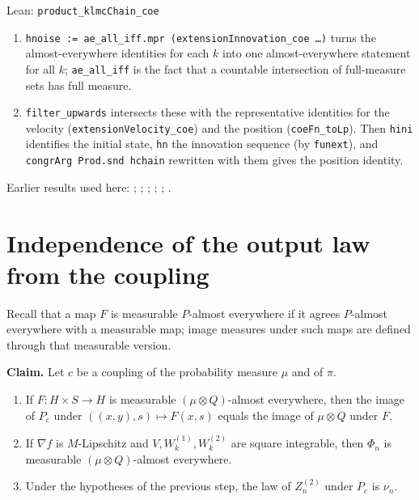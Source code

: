 \documentclass[11pt,a4paper]{article}
\begin{document}
\begin{leanbox}{Lean: \texttt{product\_\allowbreak{}klmcChain\_\allowbreak{}coe}}
\begin{enumerate}
\item \texttt{hnoise := ae\_\allowbreak{}all\_\allowbreak{}iff.\allowbreak{}mpr (extension\allowbreak{}Innovation\_\allowbreak{}coe …)} turns the almost-everywhere identities for each \(k\) into one almost-everywhere statement for all \(k\); \texttt{ae\_\allowbreak{}all\_\allowbreak{}iff} is the fact that a countable intersection of full-measure sets has full measure.

\item \texttt{filter\_\allowbreak{}upwards} intersects these with the representative identities for the velocity (\texttt{extension\allowbreak{}Velocity\_\allowbreak{}coe}) and the position (\texttt{coe\allowbreak{}Fn\_\allowbreak{}to\allowbreak{}Lp}). Then \texttt{hini} identifies the initial state, \texttt{hn} the innovation sequence (by \texttt{funext}), and \texttt{congr\allowbreak{}Arg Prod.\allowbreak{}snd hchain} rewritten with them gives the position identity.

\end{enumerate}
\end{leanbox}


Earlier results used here: \cite[Section~3.13.2]{LangevinLean2026ULASC}; \cite[Section~3.17.1]{LangevinLean2026ULASC}; \cite[Section~3.17.2]{LangevinLean2026ULASC}; \cite[Section~3.22.18]{LangevinLean2026ULASC}; \cite[Section~3.22.19]{LangevinLean2026ULASC}; \cite[Section~3.22.2]{LangevinLean2026ULASC}.

\section{\texorpdfstring{Independence of the output law from the coupling}{Independence of the output law from the coupling}}


Recall that a map \(F\) is measurable \(P\)-almost everywhere if it agrees \(P\)-almost everywhere with a measurable map; image measures under such maps are defined through that measurable version.




\textbf{Claim.} Let \(c\) be a coupling of the probability measure \(\mu\) and of \(\pi\).



\begin{enumerate}


\item If \(F:H\times S\to H\) is measurable \((\mu\otimes Q)\)-almost everywhere, then the image of \(P_c\) under \(((x,y),s)\mapsto F(x,s)\) equals the image of \(\mu\otimes Q\) under \(F\).

\item If \(\nabla f\) is \(M\)-Lipschitz and \(V,W_k^{(1)},W_k^{(2)}\) are square integrable, then \(\Phi_n\) is measurable \((\mu\otimes Q)\)-almost everywhere.

\item Under the hypotheses of the previous step, the law of \(Z_n^{(2)}\) under \(P_c\) is \(\nu_n\).

\end{enumerate}
\end{document}
